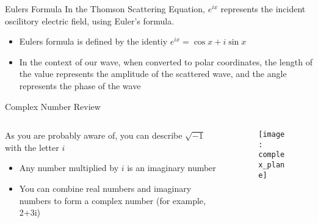 \documentclass[aspectratio=169]{beamer}
\begin{document}
\begin{frame}[t]{Eulers Formula}
	In the Thomson Scattering Equation, $e^{ix}$ represents the incident oscilitory electric field, using Euler's formula.
				
	\begin{itemize}
		\item Eulers formula is defined by the identiy $ e^{ix} = \cos x + i \sin x $
		\item In the context of our wave, when converted to polar coordinates, the length of the value represents the amplitude of the scattered wave, and the angle represents the phase of the wave
	\end{itemize}
\end{frame}

\begin{frame}[t]{Complex Number Review}
			
	\begin{columns}[c]
							
		\begin{column}{.5\textwidth}
			As you are probably aware of, you can describe $\sqrt{-1}$ with the letter $i$
			\begin{itemize}
				\item Any number multiplied by $i$ is an imaginary number
				\item You can combine real numbers and imaginary numbers to form a complex number (for example, 2+3i)
			\end{itemize}
		\end{column}
							
		\begin{column}{.5\textwidth}
			\begin{figure}
				\texttt{[image: complex\_plane]}
			\end{figure}
		\end{column}
							
	\end{columns}
				
\end{frame}
\end{document}
